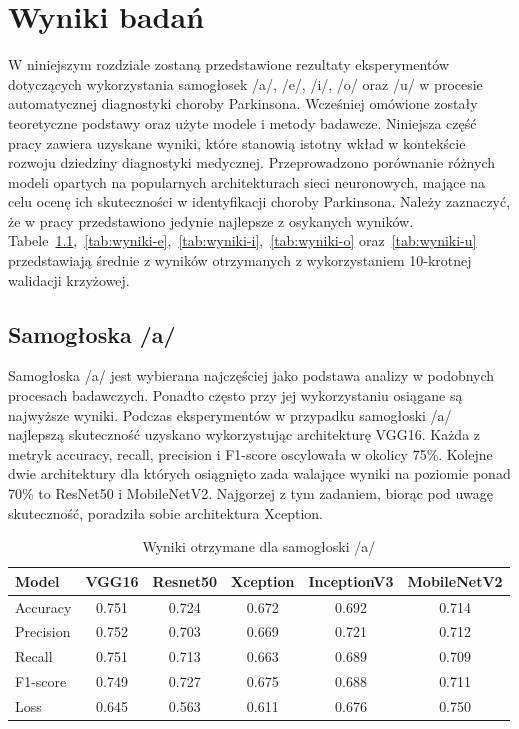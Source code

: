 \chapter{Wyniki badań}
\label{ch:wyniki}

W niniejszym rozdziale zostaną przedstawione rezultaty eksperymentów dotyczących wykorzystania samogłosek /a/, /e/, /i/, /o/ oraz /u/ w procesie automatycznej diagnostyki choroby Parkinsona.
Wcześniej omówione zostały teoretyczne podstawy oraz użyte modele i metody badawcze.
Niniejsza część pracy zawiera uzyskane wyniki, które stanowią istotny wkład w kontekście rozwoju dziedziny diagnostyki medycznej.
Przeprowadzono porównanie różnych modeli opartych na popularnych architekturach sieci neuronowych, mające na celu ocenę ich skuteczności w identyfikacji choroby Parkinsona.
Należy zaznaczyć, że w pracy przedstawiono jedynie najlepsze z osykanych wyników.
Tabele~\ref{tab:wyniki-a},~\ref{tab:wyniki-e},~\ref{tab:wyniki-i},~\ref{tab:wyniki-o} oraz~\ref{tab:wyniki-u} przedstawiają średnie z wyników otrzymanych z wykorzystaniem 10-krotnej walidacji krzyżowej.


\section{Samogłoska /a/}
\label{sec:samogloska-a}

Samogłoska /a/ jest wybierana najczęściej jako podstawa analizy w podobnych procesach badawczych.
Ponadto często przy jej wykorzystaniu osiągane są najwyższe wyniki.
Podczas eksperymentów w przypadku samogłoski /a/ najlepszą skuteczność uzyskano wykorzystując architekturę VGG16.
Każda z metryk accuracy, recall, precision i F1-score oscylowała w okolicy 75\%.
Kolejne dwie architektury dla których osiągnięto zada walające wyniki na poziomie ponad 70\% to ResNet50 i MobileNetV2.
Najgorzej z tym zadaniem, biorąc pod uwagę skuteczność, poradziła sobie architektura Xception.

\begin{table}[ht]
\centering
\caption{Wyniki otrzymane dla samogłoski /a/}
\label{tab:wyniki-a}
\begin{tabular}{|l|c|c|c|c|c|}
\hline
\textbf{Model} &\textbf{VGG16} &\textbf{Resnet50} &\textbf{Xception} &\textbf{InceptionV3} &\textbf{MobileNetV2} \\ \hline
    Accuracy &0.751 &0.724 &0.672 &0.692 &0.714 \\ \hline
    Precision &0.752 &0.703 &0.669 &0.721 &0.712 \\ \hline
    Recall &0.751 &0.713 &0.663 &0.689 &0.709 \\ \hline
    F1-score &0.749 &0.727 &0.675 &0.688 &0.711 \\ \hline
    Loss &0.645 &0.563 &0.611 &0.676 &0.750 \\ \hline
\end{tabular}
\end{table}

